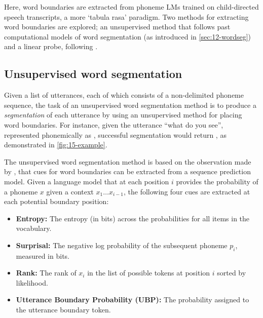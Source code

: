 Here, word boundaries are extracted from phoneme LMs trained on child-directed speech transcripts, a more `tabula rasa' paradigm. Two methods for extracting word boundaries are explored; an unsupervised method that follows past computational models of word segmentation (as introduced in \cref{sec:12-wordseg}) and a linear probe, following \citet{hahn-baroni-2019-tabula}.

\subsection{Unsupervised word segmentation}\label{sec:15-wordsegunsupervised}

Given a list of utterances, each of which consists of a non-delimited phoneme sequence, the task of an unsupervised word segmentation method is to produce a \emph{segmentation} of each utterance by using an unsupervised method for placing word boundaries. For instance, given the utterance ``what do you see'', represented phonemically as , successful segmentation would return , as demonstrated in \cref{fig:15-example}.

The unsupervised word segmentation method is based on the observation made by \citet{elman-1990-finding}, that cues for word boundaries can be extracted from a sequence prediction model. Given a language model that at each position $i$ provides the probability of a phoneme $x$ given a context $x_1\ldots x_{i-1}$, the following four cues are extracted at each potential boundary position:

\begin{itemize}[leftmargin=*]
    \item \textbf{Entropy:} The entropy (in bits) across the probabilities for all items in the vocabulary.%
    \item \textbf{Surprisal:} The negative log probability of the subsequent phoneme $p_i$, measured in bits. %
    \item \textbf{Rank:} The rank of $x_i$ in the list of possible tokens at position $i$ sorted by likelihood.
    \item \textbf{Utterance Boundary Probability (UBP):} The probability assigned to the utterance boundary token.
\end{itemize}

